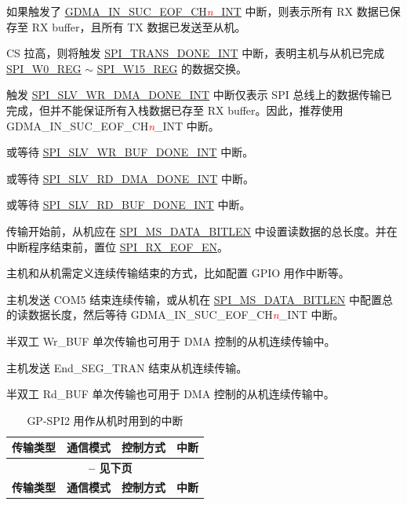 \documentclass[main\_\_CN.tex]{subfiles}
\begin{document}
\begin{ThreePartTable}

\begin{TableNotes}
    \item[1] 如果触发了  \hyperref[int:GDMAINSUCEOFINT]{GDMA\_IN\_SUC\_EOF\_CH\textcolor{red}{\it{n}}\_INT}  中断，则表示所有 RX 数据已保存至 RX buffer，且所有 TX 数据已发送至从机。
    \item[2] CS 拉高，则将触发  \hyperref[int:SPITRANSDONEINT]{SPI\_TRANS\_DONE\_INT} 中断，表明主机与从机已完成  \hyperref[regdesc:SPIW0REG]{SPI\_W0\_REG} $\sim$ \hyperref[regdesc:SPIW0REG]{SPI\_W15\_REG} 的数据交换。
    \item[3] 触发  \hyperref[int:SPISLVWRDMADONEINT]{SPI\_SLV\_WR\_DMA\_DONE\_INT} 中断仅表示 SPI 总线上的数据传输已完成，但并不能保证所有入栈数据已存至 RX buffer。因此，推荐使用 GDMA\_IN\_SUC\_EOF\_CH\textcolor{red}{\it{n}}\_INT 中断。
    \item[4] 或等待 \hyperref[int:SPISLVWRBUFDONEINT]{SPI\_SLV\_WR\_BUF\_DONE\_INT} 中断。
    \item[5] 或等待 \hyperref[int:SPISLVRDDMADONEINT]{SPI\_SLV\_RD\_DMA\_DONE\_INT} 中断。
    \item[6] 或等待 \hyperref[int:SPISLVRDBUFDONEINT]{SPI\_SLV\_RD\_BUF\_DONE\_INT} 中断。
    \item[7] 传输开始前，从机应在  \hyperref[fielddesc:SPIMSDATABITLEN]{SPI\_MS\_DATA\_BITLEN} 中设置读数据的总长度。并在中断程序结束前，置位 \hyperref[fielddesc:SPIRXEOFEN]{SPI\_RX\_EOF\_EN}。
    \item[8] 主机和从机需定义连续传输结束的方式，比如配置 GPIO 用作中断等。
    \item[9] 主机发送 COM5 结束连续传输，或从机在  \hyperref[fielddesc:SPIMSDATABITLEN]{SPI\_MS\_DATA\_BITLEN} 中配置总的读数据长度，然后等待 GDMA\_IN\_SUC\_EOF\_CH\textcolor{red}{\it{n}}\_INT 中断。
    \item[10] 半双工 Wr\_BUF 单次传输也可用于 DMA 控制的从机连续传输中。
    \item[11] 主机发送 End\_SEG\_TRAN 结束从机连续传输。
    \item[12] 半双工 Rd\_BUF 单次传输也可用于 DMA 控制的从机连续传输中。
\end{TableNotes}
\begin{longtable}[c]{|c|l|l|l|}
\caption{GP-SPI2 用作从机时用到的中断}\label{Table:Slv_Int_Table}
\\
\hline

\rowcolor{lightgray}
\textbf{传输类型 } & \textbf{ 通信模式} & \textbf{ 控制方式} & \textbf{ 中断 } \\\hline
    \endfirsthead
    \multicolumn{4}{c}{\bfseries \tablename\ \thetable{} -- 见下页}\\\hline
    \rowcolor{lightgray}
    \textbf{传输类型 } & \textbf{ 通信模式} & \textbf{ 控制方式} & \textbf{ 中断 }\\\hline
    \endhead
    

\end{longtable}
\end{ThreePartTable}
\end{document}
